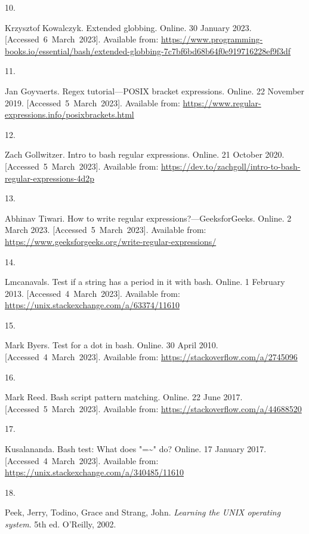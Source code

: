 \documentclass[
  a4paper,
]{article}
\newlength{\cslhangindent}
\newlength{\csllabelwidth}
\newlength{\cslentryspacingunit} %
\newenvironment{CSLReferences}[2] %
 {%
  \setlength{\parindent}{0pt}
  \ifodd #1
  \let\oldpar\par
  \def\par{\hangindent=\cslhangindent\oldpar}
  \fi
  \setlength{\parskip}{#2\cslentryspacingunit}
 }%
 {}
\newcommand{\CSLLeftMargin}[1]{\parbox[t]{\csllabelwidth}{#1}}
\newcommand{\CSLRightInline}[1]{\parbox[t]{\linewidth - \csllabelwidth}{#1}\break}
\begin{document}
\begin{CSLReferences}{0}{0}
\leavevmode{}%
\CSLLeftMargin{10. }%
\CSLRightInline{Krzysztof Kowalczyk. Extended globbing. Online. 30
January 2023. {[}Accessed~6~March~2023{]}. Available from:
\url{https://www.programming-books.io/essential/bash/extended-globbing-7c7bf6bd68b64f0e919716228ef9f3df}}

\leavevmode{}%
\CSLLeftMargin{11. }%
\CSLRightInline{Jan Goyvaerts. Regex tutorial---POSIX bracket
expressions. Online. 22 November 2019. {[}Accessed~5~March~2023{]}.
Available from:
\url{https://www.regular-expressions.info/posixbrackets.html}}

\leavevmode{}%
\CSLLeftMargin{12. }%
\CSLRightInline{Zach Gollwitzer. Intro to bash regular expressions.
Online. 21 October 2020. {[}Accessed~5~March~2023{]}. Available from:
\url{https://dev.to/zachgoll/intro-to-bash-regular-expressions-4d2p}}

\leavevmode{}%
\CSLLeftMargin{13. }%
\CSLRightInline{Abhinav Tiwari. How to write regular
expressions?---GeeksforGeeks. Online. 2 March 2023.
{[}Accessed~5~March~2023{]}. Available from:
\url{https://www.geeksforgeeks.org/write-regular-expressions/}}

\leavevmode{}%
\CSLLeftMargin{14. }%
\CSLRightInline{Lmcanavals. Test if a string has a period in it with
bash. Online. 1 February 2013. {[}Accessed~4~March~2023{]}. Available
from: \url{https://unix.stackexchange.com/a/63374/11610}}

\leavevmode{}%
\CSLLeftMargin{15. }%
\CSLRightInline{Mark Byers. Test for a dot in bash. Online. 30 April
2010. {[}Accessed~4~March~2023{]}. Available from:
\url{https://stackoverflow.com/a/2745096}}

\leavevmode{}%
\CSLLeftMargin{16. }%
\CSLRightInline{Mark Reed. Bash script pattern matching. Online. 22 June
2017. {[}Accessed~5~March~2023{]}. Available from:
\url{https://stackoverflow.com/a/44688520}}

\leavevmode{}%
\CSLLeftMargin{17. }%
\CSLRightInline{Kusalananda. Bash test: What does "=\textasciitilde" do?
Online. 17 January 2017. {[}Accessed~4~March~2023{]}. Available from:
\url{https://unix.stackexchange.com/a/340485/11610}}

\leavevmode{}%
\CSLLeftMargin{18. }%
\CSLRightInline{Peek, Jerry, Todino, Grace and Strang, John.
\emph{Learning the UNIX operating system}. 5th ed. O'Reilly, 2002. }


\end{CSLReferences}
\end{document}
